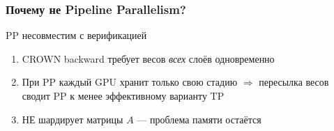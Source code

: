 \begin{frame}
\frametitle{Почему не Pipeline Parallelism?}

\begin{alertblock}{PP несовместим с верификацией}
\begin{enumerate}
    \item CROWN backward требует весов \textit{всех} слоёв одновременно
    \item При PP каждый GPU хранит только свою стадию $\Rightarrow$ пересылка весов сводит PP к менее эффективному варианту TP
    \item НЕ шардирует матрицы $A$ --- проблема памяти остаётся
\end{enumerate}
\end{alertblock}

\end{frame}
